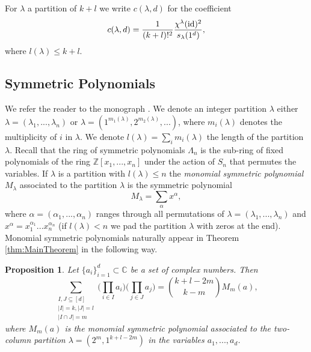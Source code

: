 \documentclass[11pt, a4paper, oneside, reqno]{amsart}
\newtheorem{proposition}[theorem]{Proposition}
\theoremstyle{remark}
\theoremstyle{definition}
\numberwithin{equation}{section}
\begin{document}
For $\lambda$ a partition of $k+l$ we write $c(\lambda, d)$ for the coefficient
\begin{equation}
\label{eqn:coeffc}
c(\lambda, d) = \frac{1}{(k+l)!^2}\frac{\chi^{\lambda}({\rm id})^2}{s_\lambda(1^d)},
\end{equation}
where $l(\lambda) \leq k+l$.
\subsection{Symmetric Polynomials} \label{sec:SymmPoly} We refer the reader to the monograph \cite{macdonald1998symmetric}.
We denote an integer partition $\lambda$ either $\lambda = (\lambda_1,...,\lambda_n)$ or $\lambda = (1^{m_1(\lambda)},2^{m_2(\lambda)},...)$, where $m_i(\lambda)$ denotes the multiplicity of $i$ in $\lambda$. We denote $l(\lambda) = \sum_i m_i(\lambda)$ the length of the partition $\lambda$. Recall that the ring of symmetric polynomials $\Lambda_n$ is the sub-ring of fixed polynomials of the  ring $\mathbb{Z}[x_1,...,x_n]$ under the action of $S_n$ that permutes the variables.
If $\lambda$ is a partition with $l(\lambda) \leq n$  the {\it monomial symmetric polynomial } $M_\lambda$ associated to the partition $\lambda$ is the symmetric polynomial
$$
	M_\lambda = \sum_\alpha x^\alpha,
$$
where $\alpha = (\alpha_1,...,\alpha_n)$ ranges through all permutations of $\lambda = (\lambda_1,...,\lambda_n)$ and $x^\alpha = x_1^{\alpha_1}...x_n^{\alpha_n}$ (if $l(\lambda) < n$ we pad the partition $\lambda$ with zeros at the end). Monomial symmetric polynomials naturally appear in Theorem \ref{thm:MainTheorem} in the following way.
\begin{proposition}
\label{prop:MonSymmFun}
Let $\{a_i\}_{i=1}^d \subset \mathbb{C}$ be a set of complex numbers. Then
$$
\sum_{\substack{I,J \subseteq [d]\\ |I| = k, |J| = l \\ |I \cap J| =m}}
        \Big(\prod_{i\in I} a_i\Big)
       \Big(\prod_{j\in J} a_j\Big) = \binom{k+l-2m}{k-m} M_m(a),
$$
where $M_m(a)$ is the monomial symmetric polynomial associated to the two-column partition $\lambda = (2^{m},1^{k+l-2m})$ in the variables $a_1,...,a_d$.
\end{proposition}
\end{document}
